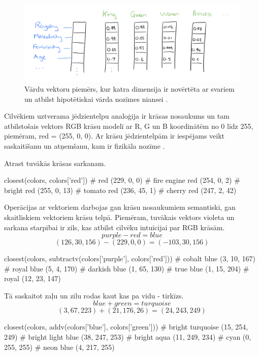 \begin{figure}[h]
	\centering
	\includegraphics[width=\textwidth]{figures/word2vec-distributed-representation.png}
	\caption{Vārdu vektoru piemērs, kur katra dimensija ir novērtēta ar svariem un atbilst hipotētiskai vārda nozīmes niansei \cite{colyer2016}.}
	\label{fig:distributed-representation}
\end{figure}

Cilvēkiem uztverama jēdzientelpu analoģija ir krāsas nosaukums un tam atbilstošais vektors RGB krāsu modelī ar R, G un B koordinātēm no 0 līdz 255, piemēram, red = (255, 0, 0). Ar krāsu jēdzientelpām ir iespējams veikt saskaitīšanu un atņemšanu, kam ir fizikāla nozīme \cite{parrish2017}.

Atrast tuvākās krāsas sarkanam.
\begin{python}
closest(colors, colors['red'])
# red (229, 0, 0)
# fire engine red (254, 0, 2)
# bright red (255, 0, 13)
# tomato red (236, 45, 1)
# cherry red (247, 2, 42)
\end{python}

Operācijas ar vektoriem darbojas gan krāsu nosaukumiem semantiski, gan skaitliskiem vektoriem krāsu telpā. Piemēram, tuvākais vektors violeta un sarkana starpībai ir zils, kas atbilst cilvēku intuīcijai par RGB krāsām.
$$purple - red = blue$$
$$(126, 30, 156) - (229, 0, 0) = (-103, 30, 156)$$
\begin{python}
closest(colors, subtractv(colors['purple'], colors['red']))
# cobalt blue (3, 10, 167)
# royal blue (5, 4, 170)
# darkish blue (1, 65, 130)
# true blue (1, 15, 204)
# royal (12, 23, 147)
\end{python}

Tā saskaitot zaļu un zilu rodas kaut kas pa vidu - tirkīzs.
$$blue + green = turquoise$$
$$(3, 67, 223) + (21, 176, 26) = (24, 243, 249)$$
\begin{python}
closest(colors, addv(colors['blue'], colors['green']))
# bright turquoise (15, 254, 249)
# bright light blue (38, 247, 253)
# bright aqua (11, 249, 234)
# cyan (0, 255, 255)
# neon blue (4, 217, 255)
\end{python}

